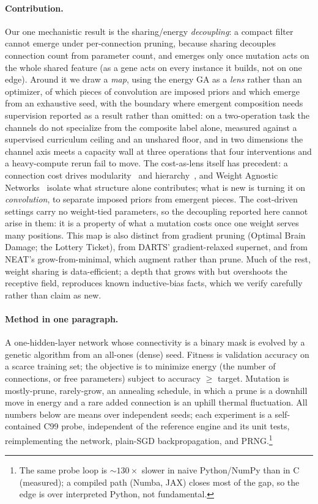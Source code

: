 \documentclass[11pt]{article}
\begin{document}
\paragraph{Contribution.} Our one mechanistic result is the sharing/energy
\emph{decoupling}: a compact filter cannot emerge under per-connection pruning, because sharing decouples
connection count from parameter count, and emerges only once mutation acts on the whole shared feature (as
a gene acts on every instance it builds, not on one edge). Around it we draw a \emph{map}, using the energy
GA as a \emph{lens} rather than an optimizer, of which pieces of convolution are imposed priors and which
emerge from an exhaustive seed, with the boundary where emergent composition needs supervision reported as
a result rather than omitted: on a two-operation task the channels do not specialize from the composite
label alone, measured against a supervised curriculum ceiling and an unshared floor, and in two
dimensions the channel axis meets a capacity wall at three operations that four interventions and a
heavy-compute rerun fail to move. The cost-as-lens
itself has precedent: a connection cost drives modularity~\cite{clune} and hierarchy~\cite{mengistu}, and
Weight Agnostic Networks~\cite{wann} isolate what structure alone contributes; what is new is turning it on
\emph{convolution}, to separate imposed priors from emergent pieces. The cost-driven settings carry no
weight-tied parameters, so the decoupling reported here cannot arise in them: it is a property of what a
mutation costs once one weight serves many positions. This map is also distinct from gradient pruning (Optimal Brain Damage; the Lottery Ticket), from DARTS' gradient-relaxed
supernet, and from NEAT's grow-from-minimal, which augment rather than prune. Much of the rest, weight sharing is data-efficient; a depth that grows with but overshoots the receptive field,
reproduces known inductive-bias facts, which we verify carefully rather than claim as new.

\paragraph{Method in one paragraph.} A one-hidden-layer network whose connectivity is a binary mask is
evolved by a genetic algorithm from an all-ones (dense) seed. Fitness is validation accuracy on a scarce
training set; the objective is to minimize energy (the number of connections, or free parameters) subject
to accuracy $\geq$ target. Mutation is mostly-prune, rarely-grow, an annealing schedule, in which a
prune is a downhill move in energy and a rare added connection is an uphill thermal fluctuation. All
numbers below are means over independent seeds; each experiment is a self-contained C99
probe, independent of the reference engine and its unit tests, reimplementing the network, plain-SGD
backpropagation, and PRNG.\footnote{The same probe loop is ${\sim}130\times$ slower in naive Python/NumPy than in C
(measured); a compiled path (Numba, JAX) closes most of the gap, so the edge is over interpreted Python,
not fundamental.}
\end{document}
